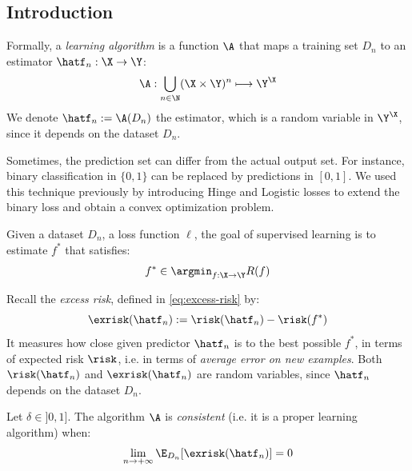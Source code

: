 \documentclass{../cs-classes/cs-classes}
\begin{document}
\subsection{Introduction}
\begin{definition}
    Formally, a \emph{learning algorithm} is a function $\A$ that maps a training set $D_n$ to an estimator $\hatf_n : \X\to\Y$:
    \begin{equation*}
        \A : \bigcup_{n\in\N}(\X\times\Y)^n \longmapsto \Y^\X
    \end{equation*}
    We denote $\hatf_n := \A(D_n)$ the estimator, which is a random variable in $\Y^\X$, since it depends on the dataset $D_n$.
\end{definition}
\begin{remark}
    Sometimes, the prediction set can differ from the actual output set. For instance, binary classification in $\{0, 1\}$ can be replaced by predictions in $[0, 1]$. We used this technique previously by introducing Hinge and Logistic losses to extend the binary loss and obtain a convex optimization problem.
\end{remark}

\begin{definition}
    Given a dataset $D_n$, a loss function $\ell$, the goal of supervised learning is to estimate $f^*$ that satisfies:
    \begin{equation*}
        f^*\in\argmin_{f:\X\to\Y} R(f)
    \end{equation*}
\end{definition}

Recall the \emph{excess risk}, defined in \eqref{eq:excess-risk} by:
\begin{equation*}
    \exrisk(\hatf_n) := \risk(\hatf_n) - \risk(f^*)
\end{equation*}
It measures how close given predictor $\hatf_n$ is to the best possible $f^*$, in terms of expected risk $\risk$, i.e. in terms of \emph{average error on new examples}. Both $\risk(\hatf_n)$ and $\exrisk(\hatf_n)$ are random variables, since $\hatf_n$ depends on the dataset $D_n$.

\begin{definition}[Consistency]
    Let $\delta\in]0,1]$. The algorithm $\A$ is \emph{consistent} (i.e. it is a proper learning algorithm) when:
    \begin{equation*}
        \lim_{n\to+\infty} \E_{D_n}[\exrisk(\hatf_n)] = 0
    \end{equation*}
\end{definition}
\end{document}
